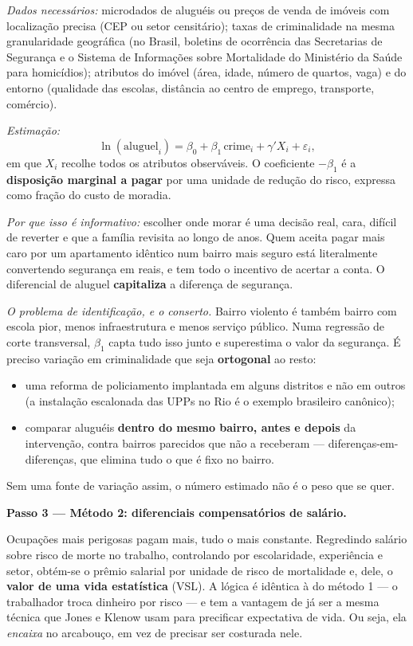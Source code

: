 \documentclass[11pt, a4paper]{article}
\newcommand{\passo}[1]{\medskip\noindent\textbf{#1}\par\nobreak}
\begin{document}
\emph{Dados necessários:} microdados de aluguéis ou preços de venda de imóveis com
localização precisa (CEP ou setor censitário); taxas de criminalidade na mesma
granularidade geográfica (no Brasil, boletins de ocorrência das Secretarias de Segurança e
o Sistema de Informações sobre Mortalidade do Ministério da Saúde para homicídios);
atributos do imóvel (área, idade, número de quartos, vaga) e do entorno (qualidade das
escolas, distância ao centro de emprego, transporte, comércio).

\emph{Estimação:}
$$\ln(\text{aluguel}_i) = \beta_0 + \beta_1\,\text{crime}_i + \gamma' X_i + \varepsilon_i,$$
em que $X_i$ recolhe todos os atributos observáveis. O coeficiente $-\beta_1$ é a
\textbf{disposição marginal a pagar} por uma unidade de redução do risco, expressa como
fração do custo de moradia.

\emph{Por que isso é informativo:} escolher onde morar é uma decisão real, cara, difícil
de reverter e que a família revisita ao longo de anos. Quem aceita pagar mais caro por um
apartamento idêntico num bairro mais seguro está literalmente convertendo segurança em
reais, e tem todo o incentivo de acertar a conta. O diferencial de aluguel
\textbf{capitaliza} a diferença de segurança.

\emph{O problema de identificação, e o conserto.} Bairro violento é também bairro com
escola pior, menos infraestrutura e menos serviço público. Numa regressão de corte
transversal, $\beta_1$ capta tudo isso junto e superestima o valor da segurança. É preciso
variação em criminalidade que seja \textbf{ortogonal} ao resto:
\begin{itemize}
\item uma reforma de policiamento implantada em alguns distritos e não em outros
      (a instalação escalonada das UPPs no Rio é o exemplo brasileiro canônico);
\item comparar aluguéis \textbf{dentro do mesmo bairro, antes e depois} da intervenção,
      contra bairros parecidos que não a receberam --- diferenças-em-diferenças, que
      elimina tudo o que é fixo no bairro.
\end{itemize}
Sem uma fonte de variação assim, o número estimado não é o peso que se quer.

\passo{Passo 3 --- Método 2: diferenciais compensatórios de salário.}

Ocupações mais perigosas pagam mais, tudo o mais constante. Regredindo salário sobre risco
de morte no trabalho, controlando por escolaridade, experiência e setor, obtém-se o prêmio
salarial por unidade de risco de mortalidade e, dele, o \textbf{valor de uma vida
estatística} (VSL). A lógica é idêntica à do método 1 --- o trabalhador troca dinheiro por
risco --- e tem a vantagem de já ser a mesma técnica que Jones e Klenow usam para
precificar expectativa de vida. Ou seja, ela \emph{encaixa} no arcabouço, em vez de
precisar ser costurada nele.
\end{document}

